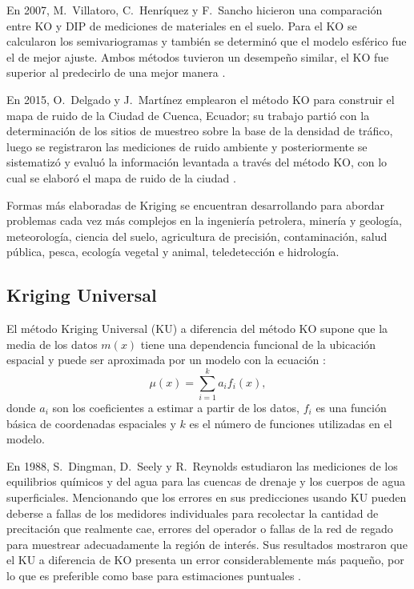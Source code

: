En 2007, M.\ Villatoro, C.\ Henríquez y F.\ Sancho hicieron una comparación entre KO y DIP de mediciones de materiales en el suelo. Para el KO se calcularon los semivariogramas y también se determinó que el modelo esférico fue el de mejor ajuste. Ambos métodos tuvieron un desempeño similar, el KO fue superior al predecirlo de una mejor manera \citep{villatoro}.

En 2015, O.\ Delgado y J.\ Martínez emplearon el método KO para construir el mapa de ruido de la Ciudad de Cuenca, Ecuador; su trabajo partió con la determinación de los sitios de muestreo sobre la base de la densidad de tráfico, luego se registraron las mediciones de ruido ambiente y posteriormente se sistematizó y evaluó la información levantada a través del método KO, con lo cual se elaboró el mapa de ruido de la ciudad \citep{delgado}.

Formas más elaboradas de Kriging se encuentran desarrollando para abordar problemas cada vez más complejos en la ingeniería petrolera, minería y geología, meteorología, ciencia del suelo, agricultura de precisión, contaminación, salud pública, pesca, ecología vegetal y animal, teledetección e hidrología.



\subsection{Kriging Universal}

El método Kriging Universal (KU) a diferencia del método KO supone que la media de los datos $m(x)$ tiene una dependencia funcional de la ubicación espacial y puede ser aproximada por un modelo con la ecuación \citep{kumar}:
\begin{equation}
 \mu(x) = \sum_{i=1}^{k} a_{i}f_{i}(x),
\end{equation}
donde $a_{i}$ son los coeficientes a estimar a partir de los datos, $f_{i}$ es una función básica de coordenadas espaciales y $k$ es el número de funciones utilizadas en el modelo.

En 1988,  S.\ Dingman,  D.\ Seely y R.\ Reynolds estudiaron las mediciones de los equilibrios químicos y del agua para las cuencas de drenaje y los cuerpos de agua superficiales. Mencionando que los errores en sus predicciones usando KU pueden deberse a fallas de los medidores individuales para recolectar la cantidad de precitación que realmente cae, errores del operador o fallas de la red de regado para muestrear adecuadamente la región de interés. Sus resultados mostraron que el KU a diferencia de KO presenta un error considerablemente más paqueño, por lo que es preferible como base para estimaciones puntuales \citep{dingman}.

